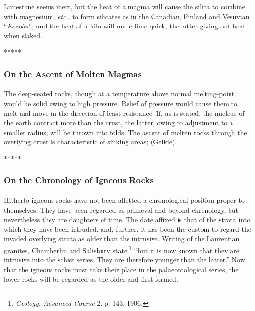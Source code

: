 \documentclass[a4paper, 12pt, oneside]{article}
\begin{document}
Limestone seems inert, but the heat of a magma will cause the silica to combine with magnesium, \emph{etc.}, to form silicates as in the Canadian, Finland and Vesuvian ``\emph{Eozoön}''; and the heat of a kiln will make lime quick, the latter giving out heat when slaked.

\centerline{*\hspace{15mm}*\hspace{15mm}*\hspace{15mm}*\hspace{15mm}*}
\bigskip

\subsubsection{On the Ascent of Molten Magmas}
\paragraph{}
The deep-seated rocks, though at a temperature above normal melting-point would be solid owing to high pressure. Relief of pressure would cause them to melt and move in the direction of least resistance. If, as is stated, the nucleus of the earth contract more than the crust, the latter, owing to adjustment to a smaller radius, will be thrown into folds. The ascent of molten rocks through the overlying crust is characteristic of sinking areas; (Geikie).

\centerline{*\hspace{15mm}*\hspace{15mm}*\hspace{15mm}*\hspace{15mm}*}
\bigskip

\subsubsection{On the Chronology of Igneous Rocks}
\paragraph{}
Hitherto igneous rocks have not been allotted a chronological position proper to themselves. They have been regarded as primeval and beyond chronology, but nevertheless they are daughters of time. The date affixed is that of the strata into which they have been intruded, and, further, it has been the custom to regard the invaded overlying strata as older than the intrusive. Writing of the Laurentian granites, Chamberlin and Salisbury state,\footnote{\emph{Geology, Advanced Course} 2. p. 143. 1906.} ``but it is now known that they are intrusive into the schist series. They are therefore younger than the latter.'' Now that the igneous rocks must take their place in the palaeontological series, the lower rocks will be regarded as the older and first formed.
\end{document}
